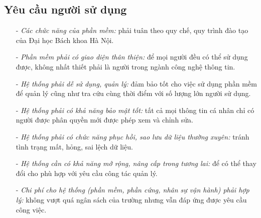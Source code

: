 \subsection{Yêu cầu người sử dụng}
\begin{itemize}
  \item[-] \textit{Các chức năng của phần mềm:} phải tuân theo quy chế, quy trình đào tạo của Đại học Bách khoa Hà Nội.
  \item[-] \textit{Phần mềm phải có giao diện thân thiện:} để mọi người đều có thể sử dụng được, không nhất thiết phải là người trong ngành công nghệ thông tin.
  \item[-] \textit{Hệ thống phải dễ sử dụng, quản lý:} đảm bảo tốt cho việc sử dụng phần mềm để quản lý cũng như tra cứu cùng thời điểm với số lượng lớn người sử dụng.
  \item[-] \textit{Hệ thống phải có khả năng bảo mật tốt:} tất cả mọi thông tin cá nhân chỉ có người được phân quyền mới được phép xem và chỉnh sửa.
  \item[-] \textit{Hệ thống phải có chức năng phục hồi, sao lưu dữ liệu thường xuyên:} tránh tình trạng mất, hỏng, sai lệch dữ liệu.
  \item[-] \textit{Hệ thống cần có khả năng mở rộng, nâng cấp trong tương lai:} để có thể thay đổi cho phù hợp với yêu cầu công tác quản lý.
  \item[-] \textit{Chi phí cho hệ thống (phần mềm, phần cứng, nhân sự vận hành) phải hợp lý:} không vượt quá ngân sách của trường nhưng vẫn đáp ứng được yêu cầu công việc. 
\end{itemize}
